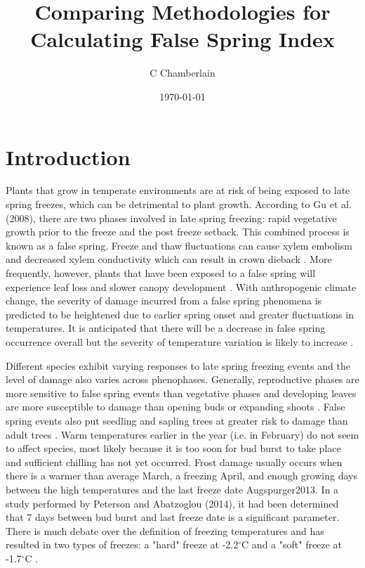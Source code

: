 \documentclass{article}
\begin{document}


\title{Comparing Methodologies for Calculating False Spring Index}
\author{C Chamberlain}
\date{\today}
\maketitle 

\renewcommand{\thetable}{\arabic{table}}
\renewcommand{\thefigure}{\arabic{figure}}
\renewcommand{\labelitemi}{$-$}
\section*{Introduction}

Plants that grow in temperate environments are at risk of being exposed to late spring freezes, which can be detrimental to plant growth. According to Gu et al. (2008), there are two phases involved in late spring freezing: rapid vegetative growth prior to the freeze and the post freeze setback. This combined process is known as a false spring. Freeze and thaw fluctuations can cause xylem embolism and decreased xylem conductivity which can result in crown dieback \cite{Gu2008}. More frequently, however, plants that have been exposed to a false spring will experience leaf loss and slower canopy development \cite{Hufkens2012}. With anthropogenic climate change, the severity of damage incurred from a false spring phenomena is predicted to be heightened due to earlier spring onset and greater fluctuations in temperatures. It is anticipated that there will be a decrease in false spring occurrence overall but the severity of temperature variation is likely to increase \cite{Allstadt2015}. 

Different species exhibit varying responses to late spring freezing events and the level of damage also varies across phenophases. Generally, reproductive phases are more sensitive to false spring events than vegetative phases and developing leaves are more susceptible to damage than opening buds or expanding shoots \cite{Peterson2014}. False spring events also put seedling and sapling trees at greater risk to damage than adult trees \cite{Vitasse2014}. Warm temperatures earlier in the year (i.e. in February) do not seem to affect species, most likely because it is too soon for bud burst to take place and sufficient chilling has not yet occurred. Frost damage usually occurs when there is a warmer than average March, a freezing April, and enough growing days between the high temperatures and the last freeze date {Augspurger2013}. In a study performed by Peterson and Abatzoglou (2014), it had been determined that 7 days between bud burst and last freeze date is a significant parameter. There is much debate over the definition of freezing temperatures and has resulted in two types of freezes: a "hard" freeze at -2.2$^{\circ}$C and a "soft" freeze at -1.7$^{\circ}$C \cite{Augspurger2013, Kodra2011, Vavrus2006}.
\end{document}
